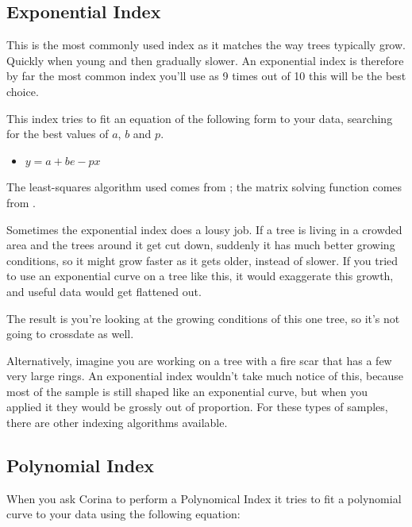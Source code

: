 \subsection{Exponential Index}
This is the most commonly used index as it matches the way trees typically grow. Quickly when young and then gradually slower.  An exponential index is therefore by far the most common index you'll use as 9 times out of 10 this will be the best choice. 

This index tries to fit an equation of the following form to your data, searching for the best values of $a$, $b$ and $p$. 
\begin{itemize}
 \item $y = a + be-px$ 
\end{itemize}


The least-squares algorithm used comes from \citet{CLR}; the matrix solving function comes from \citet{vanLoan}.

Sometimes the exponential index does a lousy job. If a tree is living in a crowded area and the trees around it get cut down, suddenly it has much better growing conditions, so it might grow faster as it gets older, instead of slower. If you tried to use an exponential curve on a tree like this, it would exaggerate this growth, and useful data would get flattened out.

The result is you're looking at the growing conditions of this one tree, so it's not going to crossdate as well.

Alternatively, imagine you are working on a tree with a fire scar that has a few very large rings. An exponential index wouldn't take much notice of this, because most of the sample is still shaped like an exponential curve, but when you applied it they would be grossly out of proportion. For these types of samples, there are other indexing algorithms available.


\subsection{Polynomial Index}
When you ask Corina to perform a Polynomical Index it tries to fit a polynomial curve to your data using the following equation: 

